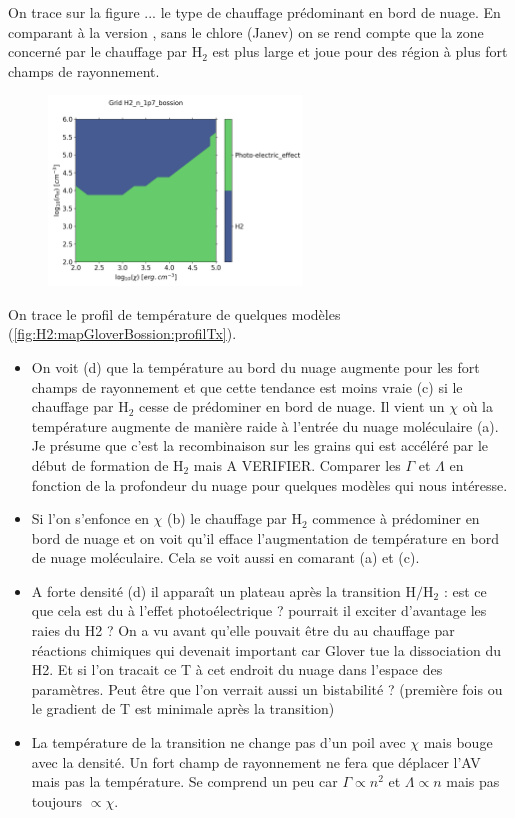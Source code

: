 On trace sur la figure ... le type de chauffage prédominant en bord de nuage. En comparant à la version \uncinq, sans le chlore (Janev) on se rend compte que la zone concerné par le chauffage par $\mathrm{H}_2$ est plus large et joue pour des région à plus fort champs de rayonnement. \newline

\begin{figure}[h!]
    \centering
    \includegraphics[width = 0.6\textwidth]{figure/H2/mapGloverBossion/mapGmax.png}
    \caption{}
    \label{fig:H2:mapGloverBossion:Gmax}
\end{figure}

On trace le profil de température de quelques modèles (\autoref{fig:H2:mapGloverBossion:profilTx}). 
\begin{itemize}
    \item On voit (d) que la température au bord du nuage augmente pour les fort champs de rayonnement et que cette tendance est moins vraie (c) si le chauffage par $\mathrm{H}_2$ cesse de prédominer en bord de nuage. Il vient un $\chi$ où la température augmente de manière raide à l'entrée du nuage moléculaire (a). Je présume que c'est la recombinaison sur les grains qui est accéléré par le début de formation de $\mathrm{H}_2$ mais A VERIFIER. Comparer les $\Gamma$ et $\Lambda$ en fonction de la profondeur du nuage pour quelques modèles qui nous intéresse.
    \item Si l'on s'enfonce en $\chi$ (b) le chauffage par $\mathrm{H}_2$ commence à prédominer en bord de nuage et on voit qu'il efface l'augmentation de température en bord de nuage moléculaire. Cela se voit aussi en comarant (a) et (c).
    \item A forte densité (d) il apparaît un plateau après la transition $\mathrm{H}/\mathrm{H}_2$ : est ce que cela est du à l'effet photoélectrique ? pourrait il exciter d'avantage les raies du H2 ? On a vu avant qu'elle pouvait être du au chauffage par réactions chimiques qui devenait important car Glover tue la dissociation du H2. Et si l'on tracait ce T à cet endroit du nuage dans l'espace des paramètres. Peut être que l'on verrait aussi un bistabilité ? (première fois ou le gradient de T est minimale après la transition)
    \item La température de la transition ne change pas d'un poil avec $\chi$ mais bouge avec la densité. Un fort champ de rayonnement ne fera que déplacer l'AV mais pas la température. Se comprend un peu car $\Gamma \propto n^2$ et $\Lambda \propto n $ mais pas toujours $\propto \chi$.
\end{itemize}

